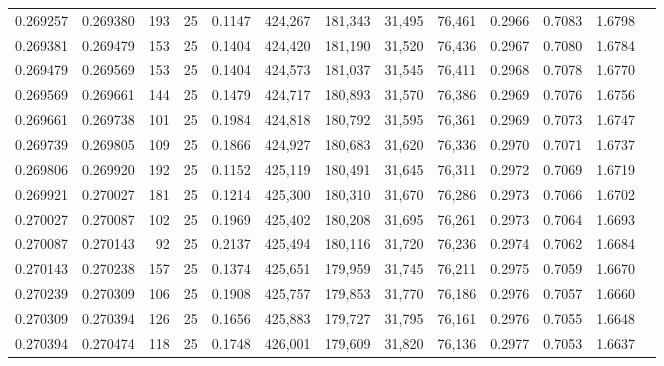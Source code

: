 \begin{tabular}{rrrrrrrrrrrrr}
0.269257 & 0.269380 &   193 &  25 &                                     0.1147 & 424,267 & 181,343 &  31,495 &  76,461 & 0.2966 & 0.7083 & 1.6798 \\
0.269381 & 0.269479 &   153 &  25 &                                     0.1404 & 424,420 & 181,190 &  31,520 &  76,436 & 0.2967 & 0.7080 & 1.6784 \\
0.269479 & 0.269569 &   153 &  25 &                                     0.1404 & 424,573 & 181,037 &  31,545 &  76,411 & 0.2968 & 0.7078 & 1.6770 \\
0.269569 & 0.269661 &   144 &  25 &                                     0.1479 & 424,717 & 180,893 &  31,570 &  76,386 & 0.2969 & 0.7076 & 1.6756 \\
0.269661 & 0.269738 &   101 &  25 &                                     0.1984 & 424,818 & 180,792 &  31,595 &  76,361 & 0.2969 & 0.7073 & 1.6747 \\
0.269739 & 0.269805 &   109 &  25 &                                     0.1866 & 424,927 & 180,683 &  31,620 &  76,336 & 0.2970 & 0.7071 & 1.6737 \\
0.269806 & 0.269920 &   192 &  25 &                                     0.1152 & 425,119 & 180,491 &  31,645 &  76,311 & 0.2972 & 0.7069 & 1.6719 \\
0.269921 & 0.270027 &   181 &  25 &                                     0.1214 & 425,300 & 180,310 &  31,670 &  76,286 & 0.2973 & 0.7066 & 1.6702 \\
0.270027 & 0.270087 &   102 &  25 &                                     0.1969 & 425,402 & 180,208 &  31,695 &  76,261 & 0.2973 & 0.7064 & 1.6693 \\
0.270087 & 0.270143 &    92 &  25 &                                     0.2137 & 425,494 & 180,116 &  31,720 &  76,236 & 0.2974 & 0.7062 & 1.6684 \\
0.270143 & 0.270238 &   157 &  25 &                                     0.1374 & 425,651 & 179,959 &  31,745 &  76,211 & 0.2975 & 0.7059 & 1.6670 \\
0.270239 & 0.270309 &   106 &  25 &                                     0.1908 & 425,757 & 179,853 &  31,770 &  76,186 & 0.2976 & 0.7057 & 1.6660 \\
0.270309 & 0.270394 &   126 &  25 &                                     0.1656 & 425,883 & 179,727 &  31,795 &  76,161 & 0.2976 & 0.7055 & 1.6648 \\
0.270394 & 0.270474 &   118 &  25 &                                     0.1748 & 426,001 & 179,609 &  31,820 &  76,136 & 0.2977 & 0.7053 & 1.6637 \\

\end{tabular}
